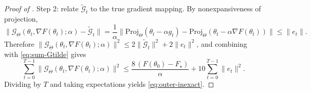 \documentclass[10pt,a4paper]{amsart}
\providecommand{\paragraph}{}
\begin{document}
\begin{proof}[Proof of ]
\paragraph{Step 2: relate $\widetilde{\mathcal G}_t$ to the true gradient mapping.}
By nonexpansiveness of projection,
\[
\|\mathcal G_{\Theta}(\theta_t,\nabla F(\theta_t);\alpha)-\widetilde{\mathcal G}_t\|
=
\frac{1}{\alpha}\big\|\mathrm{Proj}_{\Theta}(\theta_t-\alpha g_t)-\mathrm{Proj}_{\Theta}(\theta_t-\alpha\nabla F(\theta_t))\big\|
\le \|e_t\|.
\]
Therefore $\|\mathcal G_{\Theta}(\theta_t,\nabla F(\theta_t);\alpha)\|^2\le 2\|\widetilde{\mathcal G}_t\|^2+2\|e_t\|^2$,
and combining with \eqref{eq:sum-Gtilde} gives
\[
\sum_{t=0}^{T-1}\|\mathcal G_{\Theta}(\theta_t,\nabla F(\theta_t);\alpha)\|^2
\le
\frac{8\,(F(\theta_0)-F_\star)}{\alpha}
+10\sum_{t=0}^{T-1}\|e_t\|^2.
\]
Dividing by $T$ and taking expectations yields \eqref{eq:outer-inexact}.
\end{proof}
\end{document}
